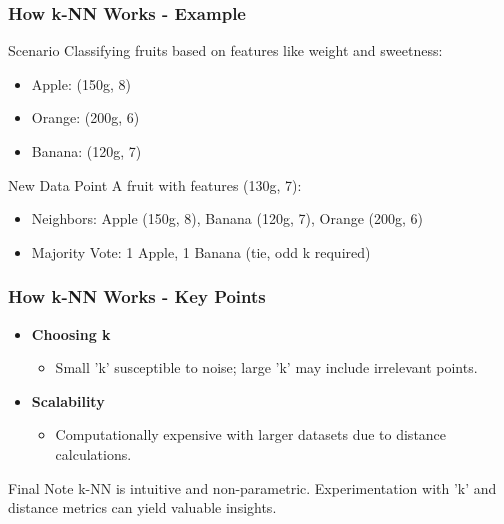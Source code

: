 \documentclass[aspectratio=169]{beamer}
\begin{document}
\begin{frame}[fragile]
    \frametitle{How k-NN Works - Example}
    \begin{block}{Scenario}
        Classifying fruits based on features like weight and sweetness:
        \begin{itemize}
            \item Apple: (150g, 8)
            \item Orange: (200g, 6)
            \item Banana: (120g, 7)
        \end{itemize}
    \end{block}
    
    \begin{block}{New Data Point}
        A fruit with features (130g, 7):
        \begin{itemize}
            \item Neighbors: Apple (150g, 8), Banana (120g, 7), Orange (200g, 6)
            \item Majority Vote: 1 Apple, 1 Banana (tie, odd k required)
        \end{itemize}
    \end{block}
\end{frame}

\begin{frame}[fragile]
    \frametitle{How k-NN Works - Key Points}
    \begin{itemize}
        \item \textbf{Choosing k}
            \begin{itemize}
                \item Small 'k' susceptible to noise; large 'k' may include irrelevant points.
            \end{itemize}
        \item \textbf{Scalability}
            \begin{itemize}
                \item Computationally expensive with larger datasets due to distance calculations.
            \end{itemize}
    \end{itemize}
    
    \begin{block}{Final Note}
        k-NN is intuitive and non-parametric. Experimentation with 'k' and distance metrics can yield valuable insights.
    \end{block}
\end{frame}
\end{document}
